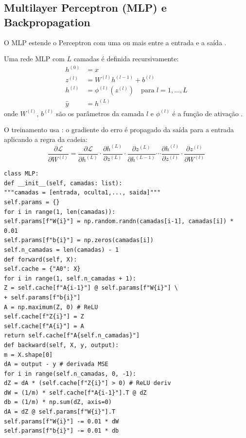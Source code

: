 \subsection{Multilayer Perceptron (MLP) e Backpropagation}
O MLP estende o Perceptron com uma ou mais 
entre a entrada e a saída \cite{rumelhart1986learning}.
\begin{definicao}[MLP]
Uma rede MLP com $L$ camadas é definida recursivamente:
\begin{align*}
h^{(0)} &= x \\
z^{(l)} &= W^{(l)} h^{(l-1)} + b^{(l)} \\
h^{(l)} &= \phi^{(l)}(z^{(l)}) \quad \text{para } l = 1, \ldots, L \\
\hat{y} &= h^{(L)}
\end{align*}
onde $W^{(l)}$, $b^{(l)}$ são os parâmetros da camada $l$ e $\phi^{(l)}$ é
a função de ativação \cite{goodfellow2016deep}.
\end{definicao}
O treinamento usa : o gradiente do erro é
propagado da saída para a entrada aplicando a regra da cadeia:
\[\frac{\partial \mathcal{L}}{\partial W^{(l)}} =
\frac{\partial \mathcal{L}}{\partial h^{(L)}} \cdot
\frac{\partial h^{(L)}}{\partial z^{(L)}} \cdot
\frac{\partial z^{(L)}}{\partial h^{(L-1)}} \cdots
\frac{\partial h^{(l)}}{\partial z^{(l)}} \cdot
\frac{\partial z^{(l)}}{\partial W^{(l)}}
\]
\begin{lstlisting}[style=pythonstyle]
class MLP:
def __init__(self, camadas: list):
"""camadas = [entrada, oculta1,..., saida]"""
self.params = {}
for i in range(1, len(camadas)):
self.params[f"W{i}"] = np.random.randn(camadas[i-1], camadas[i]) * 0.01
self.params[f"b{i}"] = np.zeros(camadas[i])
self.n_camadas = len(camadas) - 1
def forward(self, X):
self.cache = {"A0": X}
for i in range(1, self.n_camadas + 1):
Z = self.cache[f"A{i-1}"] @ self.params[f"W{i}"] \
+ self.params[f"b{i}"]
A = np.maximum(Z, 0) # ReLU
self.cache[f"Z{i}"] = Z
self.cache[f"A{i}"] = A
return self.cache[f"A{self.n_camadas}"]
def backward(self, X, y, output):
m = X.shape[0]
dA = output - y # derivada MSE
for i in range(self.n_camadas, 0, -1):
dZ = dA * (self.cache[f"Z{i}"] > 0) # ReLU deriv
dW = (1/m) * self.cache[f"A{i-1}"].T @ dZ
db = (1/m) * np.sum(dZ, axis=0)
dA = dZ @ self.params[f"W{i}"].T
self.params[f"W{i}"] -= 0.01 * dW
self.params[f"b{i}"] -= 0.01 * db
\end{lstlisting}
